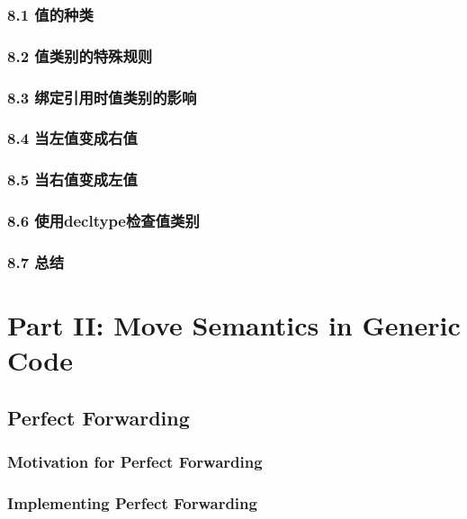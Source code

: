 \documentclass[11pt,a4paper,UTF8]{ctexart}
\begin{document}
		\subsubsection{8.1 值的种类}
		\subsubsection{8.2 值类别的特殊规则}
		\subsubsection{8.3 绑定引用时值类别的影响}
		\subsubsection{8.4 当左值变成右值}
		\subsubsection{8.5 当右值变成左值}
		\subsubsection{8.6 使用decltype检查值类别}
		\subsubsection{8.7 总结}
		
	\section{Part II: Move Semantics in Generic Code}
	\subsection{Perfect Forwarding}
		\subsubsection{Motivation for Perfect Forwarding}
		\subsubsection{Implementing Perfect Forwarding}
\end{document}
